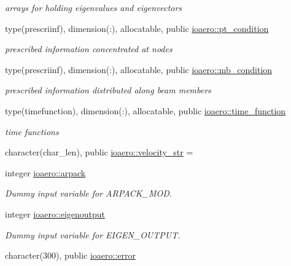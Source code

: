 \begin{DoxyCompactItemize}
\begin{DoxyCompactList}\small\item\em arrays for holding eigenvalues and eigenvectors \end{DoxyCompactList}\item 
type(prescriinf), dimension(\+:), allocatable, public \hyperlink{namespaceioaero_a4344b2018135ae7fe0a09f4265fd2c29}{ioaero\+::pt\+\_\+condition}
\begin{DoxyCompactList}\small\item\em prescribed information concentrated at nodes \end{DoxyCompactList}\item 
type(prescriinf), dimension(\+:), allocatable, public \hyperlink{namespaceioaero_a2463929ef049b49fe7b49011c66cc806}{ioaero\+::mb\+\_\+condition}
\begin{DoxyCompactList}\small\item\em prescribed information distributed along beam members \end{DoxyCompactList}\item 
type(timefunction), dimension(\+:), allocatable, public \hyperlink{namespaceioaero_accb03392882ddfd413b5ac9ce3be09c6}{ioaero\+::time\+\_\+function}
\begin{DoxyCompactList}\small\item\em time functions \end{DoxyCompactList}\item 
character(char\+\_\+len), public \hyperlink{namespaceioaero_ac653c5aea8d1de1b6255d0f47b6722f6}{ioaero\+::velocity\+\_\+str} = \textquotesingle{}\textquotesingle{}
\item 
integer \hyperlink{namespaceioaero_a02839259538f3d7e305ebe79cb43d2c4}{ioaero\+::arpack}
\begin{DoxyCompactList}\small\item\em Dummy input variable for A\+R\+P\+A\+C\+K\+\_\+\+M\+OD. \end{DoxyCompactList}\item 
integer \hyperlink{namespaceioaero_a8d534ecfa53489b513fc3e339bbfc064}{ioaero\+::eigenoutput}
\begin{DoxyCompactList}\small\item\em Dummy input variable for E\+I\+G\+E\+N\+\_\+\+O\+U\+T\+P\+UT. \end{DoxyCompactList}\item 
character(300), public \hyperlink{namespaceioaero_aebd85ae2a176f49a7213d8ed7b68f887}{ioaero\+::error}
\end{DoxyCompactItemize}
